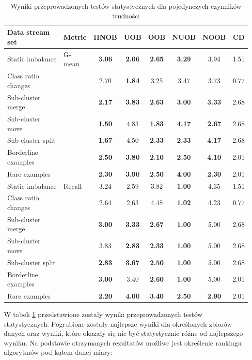 \begin{table}[ht]
\centering\small%
\setlength{\tabcolsep}{10pt} 
\renewcommand{\arraystretch}{1.5} 
\begin{tabular}{l l c c c c c c}
\toprule
Data stream set & Metric & HNOB & UOB & OOB & NUOB & NOOB & CD \\
\midrule
Static imbalance & G-mean & \textbf{3.06} & \textbf{2.06} & \textbf{2.65} & \textbf{3.29} & 3.94 & 1.51 \\
Class ratio changes & & 2.70 & \textbf{1.84} & 3.25 & 3.47 & 3.73 & 0.77 \\
Sub-cluster merge & & \textbf{2.17} & \textbf{3.83} & \textbf{2.63} & \textbf{3.00} & \textbf{3.33} & 2.68 \\
Sub-cluster move & & \textbf{1.50} & 4.83 & \textbf{1.83} & \textbf{4.17} & \textbf{2.67} & 2.68 \\
Sub-cluster split & & \textbf{1.67} & 4.50 & \textbf{2.33} & \textbf{2.33} & \textbf{4.17} & 2.68 \\
Borderline examples & & \textbf{2.50} & \textbf{3.80} & \textbf{2.10} & \textbf{2.50} & \textbf{4.10} & 2.01 \\
Rare examples & & \textbf{2.30} & \textbf{3.90} & \textbf{2.50} & \textbf{4.00} & \textbf{2.30} & 2.01 \\
Static imbalance & Recall & 3.24 & 2.59 & 3.82 & \textbf{1.00} & 4.35 & 1.51 \\
Class ratio changes & & 2.64 & 2.63 & 4.48 & \textbf{1.02} & 4.23 & 0.77 \\
Sub-cluster merge & & \textbf{3.00} & \textbf{3.33} & \textbf{2.67} & \textbf{1.00} & 5.00 & 2.68 \\
Sub-cluster move & & 3.83 & \textbf{2.83} & \textbf{2.33} & \textbf{1.00} & 5.00 & 2.68 \\
Sub-cluster split & & \textbf{2.83} & \textbf{3.67} & \textbf{2.50} & \textbf{1.00} & 5.00 & 2.68 \\
Borderline examples & & \textbf{3.00} & 3.40 & \textbf{2.60} & \textbf{1.00} & 5.00 & 2.01 \\
Rare examples & & \textbf{2.20} & \textbf{4.00} & \textbf{3.40} & \textbf{2.50} & \textbf{2.90} & 2.01 \\
\bottomrule
\end{tabular}
\caption{Wyniki przeprowadzonych testów statystycznych dla pojedynczych czynników trudności}\label{Tab:SingleDriftFriedmanHNOB}
\end{table}

\noindent W tabeli \ref{Tab:SingleDriftFriedmanHNOB} przedstawione zostały wyniki przeprowadzonych testów statystycznych. Pogrubione zostały najlepsze wyniki dla określonych zbiorów danych oraz wyniki, które okazały się nie być statystycznie różne od najlepszego wyniku. Na podstawie otrzymanych rezultatów możliwe jest określenie rankingu algorytmów pod kątem danej miary:

